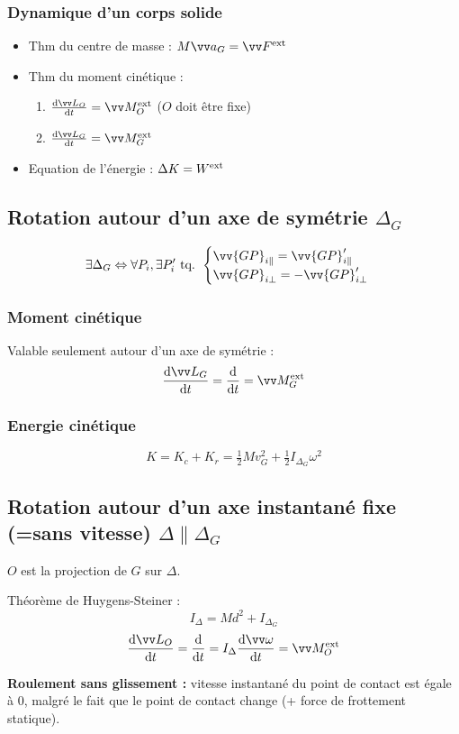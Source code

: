 \documentclass[../main.tex]{subfiles}
\begin{document}
\subsubsection{Dynamique d'un corps solide}
\begin{itemize}
  \item Thm du centre de masse : \( M\ac_G = \F^{\exte} \)
  \item Thm du moment cinétique : 
    \begin{enumerate}
      \item \(\dv{\mc_O}{t} = \mf_O^{\exte}\) (\(O\) doit être fixe)
      \item \(\dv{\mc_G}{t} = \mf_G^{\exte}\)
    \end{enumerate} 
  \item Equation de l'énergie : \(\Delta K = W^{\text{ext}}\)
\end{itemize}

\subsection{Rotation autour d'un axe de symétrie \(\Delta_G\)}
\[
  \exists \Delta_G \Leftrightarrow \forall P_i, \exists P_i' \text{ tq. } 
  \begin{cases}
    \vv{GP}_{i\parallel}=\vv{GP}_{i\parallel}'\\
    \vv{GP}_{i\bot}=-\vv{GP}_{i\bot}'\\
  \end{cases}
\]

\subsubsection{Moment cinétique}
Valable seulement autour d'un axe de symétrie : 
\[
  \dv{\mc_G}{t} = \dv{}{t}(I_{\Delta G}\vian)=\mf^{\exte}_G
\]
\subsubsection{Energie cinétique}
\[
  K = K_c + K_r = \tfrac{1}{2}Mv_G^2 + \tfrac{1}{2}I_{\Delta_G}\omega^2
\]

\subsection{Rotation autour d'un axe instantané fixe (=sans vitesse) \(\Delta \parallel \Delta_G\)}
\(O\) est la projection de \(G\) sur \(\Delta\).

Théorème de Huygens-Steiner : 
\[
  I_{\Delta} = Md^2 + I_{\Delta_G}
\]
\[
  \dv{\mc_O}{t} = \dv{}{t}(I_{\Delta}\vian) = I_{\Delta}\dv{\vian}{t}=\mf_O^{\exte}
\]

\textbf{Roulement sans glissement : } vitesse instantané du point de contact est égale à 0, malgré le fait que le point de contact change (+ force de frottement statique).
\end{document}
